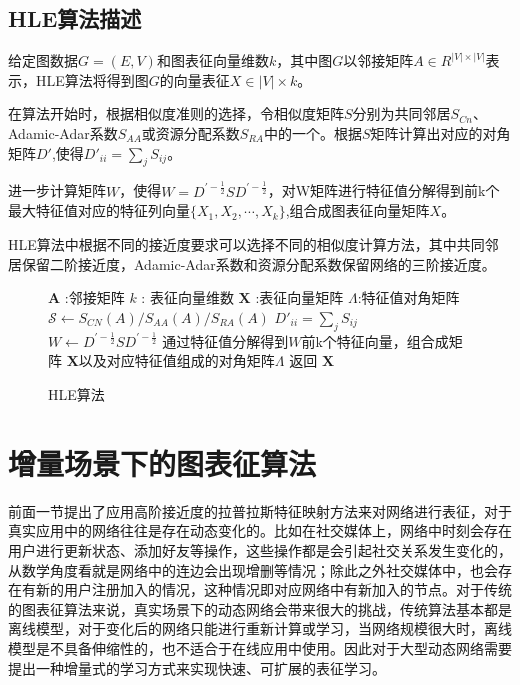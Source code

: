 \subsection{HLE算法描述}
	给定图数据$G = (E,V)$和图表征向量维数$k$，其中图$G$以邻接矩阵$A\in R^{|V|\times |V|}$表示，HLE算法将得到图$G$的向量表征$X\in |V|\times k$。
	
	在算法开始时，根据相似度准则的选择，令相似度矩阵$S$分别为共同邻居$S_{Cn}$、Adamic-Adar系数$S_{AA}$或资源分配系数$S_{RA}$中的一个。根据$S$矩阵计算出对应的对角矩阵$D\prime$,使得$D'_{ii} = \sum_j S_{ij}$。

	进一步计算矩阵$W$，使得$W=D^{\prime-\frac{1}{2}}SD^{\prime-\frac{1}{2}}$，对W矩阵进行特征值分解得到前k个最大特征值对应的特征列向量$\{X_1,X_2,\cdots,X_k\}$,组合成图表征向量矩阵$X$。
	
	HLE算法中根据不同的接近度要求可以选择不同的相似度计算方法，其中共同邻居保留二阶接近度，Adamic-Adar系数和资源分配系数保留网络的三阶接近度。


\begin{figure}[htb]
	\centering
	\begin{minipage}{.7\linewidth}
		\begin{algorithm}[H]
			\small
			\caption{HLE算法}
			\begin{algorithmic}[1]
				\Require
				\Statex $\textbf{A}$ :邻接矩阵
				\Statex $k$ : 表征向量维数
				\Ensure
				\Statex $\textbf{X}$ :表征向量矩阵
				\Statex $\Lambda$:特征值对角矩阵
				\Statex
				\State $\mathcal{S} \leftarrow S_{CN}(A) /S_{AA}(A) / S_{RA}(A)$
				\State $D'_{ii} = \sum_j S_{ij}$
				\State $W \leftarrow  D^{\prime-\frac{1}{2}}SD^{\prime-\frac{1}{2}}$
				\State 通过特征值分解得到$W$前k个特征向量，组合成矩阵 $\textbf{X}$以及对应特征值组成的对角矩阵$\Lambda$
				\State 返回 $\textbf{X}$
			\end{algorithmic}
		\end{algorithm}
	\end{minipage}
\end{figure}
\section{增量场景下的图表征算法}
前面一节提出了应用高阶接近度的拉普拉斯特征映射方法来对网络进行表征，对于真实应用中的网络往往是存在动态变化的。比如在社交媒体上，网络中时刻会存在用户进行更新状态、添加好友等操作，这些操作都是会引起社交关系发生变化的，从数学角度看就是网络中的连边会出现增删等情况；除此之外社交媒体中，也会存在有新的用户注册加入的情况，这种情况即对应网络中有新加入的节点。对于传统的图表征算法来说，真实场景下的动态网络会带来很大的挑战，传统算法基本都是离线模型，对于变化后的网络只能进行重新计算或学习，当网络规模很大时，离线模型是不具备伸缩性的，也不适合于在线应用中使用。因此对于大型动态网络需要提出一种增量式的学习方式来实现快速、可扩展的表征学习。


